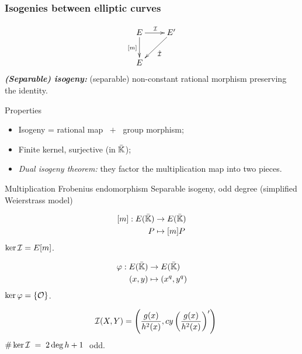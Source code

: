 \documentclass[10pt,usepdftitle=false]{beamer}
\begin{document}

\begin{frame}
  \frametitle{Isogenies between elliptic curves}
  
  \vspace{-5mm}

  {\large \[\xymatrix{E\ar[d]_{[m]}\ar[r]^{\I} & E'\ar[dl]^{\hat{\I}}\\E}\]} 
  \emph{\textbf{(Separable) isogeny:}} (separable)
  non-constant rational morphism preserving the identity.
  
  \begin{block}{Properties}
    \begin{itemize}
    \item Isogeny = rational map $\;+\;$ group morphism;
    \item Finite kernel, surjective (in $\bar{\mathbb{K}}$);
    \item \emph{Dual isogeny theorem:} they factor the multiplication map into two pieces.
    \end{itemize}
  \end{block}

  \vspace{-1mm}

  \begin{block}{
	\begin{overprint}
	 Multiplication	
	\onslide<2> Frobenius endomorphism
	\onslide<3> Separable isogeny, odd degree (simplified Weierstrass model)
	\end{overprint}
      }
    \begin{overprint}
      \[\begin{aligned}
	{}[m] : E(\bar{\mathbb{K}}) &\rightarrow E(\bar{\mathbb{K}})\\
	                   P &\mapsto [m]P
      \end{aligned}\]
      $\ker\mathcal{I} = E[m]$.

      \[\begin{aligned}
	\varphi : E(\bar{\mathbb{K}}) &\rightarrow E(\bar{\mathbb{K}})\\
	               (x,y) &\mapsto (x^q,y^q)
      \end{aligned}\]
      $\ker\varphi = \{\mathcal{O}\}$.

      \[\quad\mathcal{I}(X,Y) = \left(\frac{g(x)}{h^2(x)},
      cy\left(\frac{g(x)}{h^2(x)}\right)'\right)\]
      $\# \ker\mathcal{I} \;=\; 2\deg h + 1\;$ odd.
    \end{overprint}
  \end{block}  
\end{frame}
\end{document}
